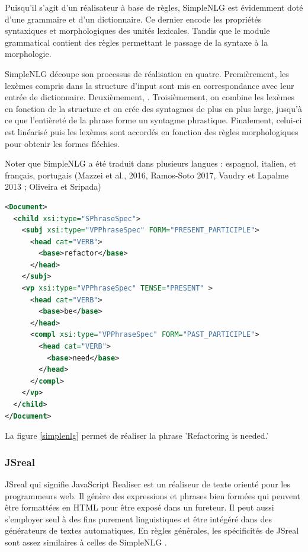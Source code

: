 Puisqu'il s'agit d'un réalisateur à base de règles, SimpleNLG est évidemment doté d'une grammaire et d'un dictionnaire. Ce dernier encode les propriétés syntaxiques et morphologiques des unités lexicales. Tandis que le module grammatical contient des règles permettant le passage de la syntaxe à la morphologie.

SimpleNLG découpe son processus de réalisation en quatre. Premièrement, les lexèmes compris dans la structure d'input sont mis en correspondance avec leur entrée de dictionnaire. Deuxièmement, . Troisièmement, on combine les lexèmes en fonction de la structure et on crée des syntagmes de plus en plus large, jusqu'à ce que l'entièreté de la phrase forme un syntagme phrastique. Finalement, celui-ci est linéarisé puis les lexèmes sont accordés en fonction des règles morphologiques pour obtenir les formes fléchies.

Noter que SimpleNLG a été traduit dans plusieurs langues : espagnol, italien, et français, portugais (Mazzei et al., 2016, Ramos-Soto 2017, Vaudry et Lapalme 2013 ; Oliveira et Sripada)

\begin{lstlisting}[language=Xml, caption=Structure d'input dans SimpleNLG, label=simplenlg]
<Document>
  <child xsi:type="SPhraseSpec">
    <subj xsi:type="VPPhraseSpec" FORM="PRESENT_PARTICIPLE">
      <head cat="VERB">
        <base>refactor</base>
      </head>
    </subj>
    <vp xsi:type="VPPhraseSpec" TENSE="PRESENT" >
      <head cat="VERB">
        <base>be</base>
      </head>
      <compl xsi:type="VPPhraseSpec" FORM="PAST_PARTICIPLE">
        <head cat="VERB">
          <base>need</base>
        </head>
      </compl>
    </vp>
  </child>
</Document>
\end{lstlisting}
La figure \ref{simplenlg} permet de réaliser la phrase 'Refactoring is needed.'

\subsubsection{JSreal}
JSreal \citep{DaoustJSREALTextRealizer2015} qui signifie JavaScript Realiser est un réaliseur de texte orienté pour les programmeurs web. Il génère des expressions et phrases bien formées qui peuvent être formattées en HTML pour être exposé dans un fureteur. Il peut aussi s'employer seul à des fins purement linguistiques et être intégéré dans des générateurs de textes automatiques. En règles générales, les spécificités de JSreal sont assez similaires à celles de SimpleNLG \citep{GattSimpleNLGRealisationEngine2009}.

